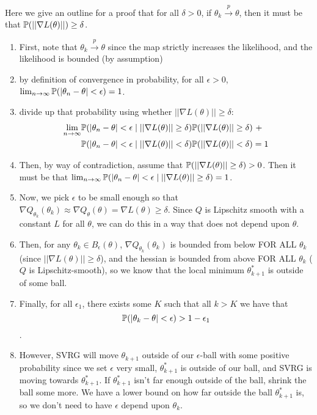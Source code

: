 Here we give an outline for a proof that for all $\delta > 0$, if $\theta_k \overset{p}{\to} \theta$, then it must be that $\mathbb{P}(||\nabla L (\theta) ||) \geq \delta$.

\begin{enumerate}
    \item First, note that $\theta_k \overset{p}{\to} \theta$ since the map strictly increases the likelihood, and the likelihood is bounded (by assumption)
    \item by definition of convergence in probability, for all $\epsilon > 0$, $\lim_{n \to \infty} \mathbb{P}(|\theta_n - \theta| < \epsilon) = 1$.
    \item divide up that probability using whether $||\nabla L (\theta) || \geq \delta$:
    \begin{align*}
    \lim_{n \to \infty} & \mathbb{P}(|\theta_n - \theta| < \epsilon \mid ||\nabla L (\theta) || \geq \delta)\mathbb{P}(||\nabla L (\theta) || \geq \delta) ~ + 
    \\ 
    & \mathbb{P}(|\theta_n - \theta| < \epsilon \mid ||\nabla L (\theta) || < \delta)\mathbb{P}(||\nabla L (\theta) || < \delta) = 1
    \end{align*}
    \item Then, by way of contradiction, assume that $\mathbb{P}(||\nabla L (\theta) || \geq \delta) > 0$. Then it must be that $\lim_{n \to \infty} \mathbb{P}(|\theta_n - \theta| < \epsilon \mid ||\nabla L (\theta) || \geq \delta) = 1$.
    \item Now, we pick $\epsilon$ to be small enough so that $\nabla Q_{\theta_k}(\theta_k) \approx \nabla Q_{\theta}(\theta) = \nabla L(\theta) \geq \delta$. Since $Q$ is Lipschitz smooth with a constant $L$ for all $\theta$, we can do this in a way that does not depend upon $\theta$.
    \item Then, for any $\theta_k \in B_\epsilon(\theta)$, $\nabla Q_{\theta_k}(\theta_k)$ is bounded from below FOR ALL $\theta_k$ (since $||\nabla L(\theta)|| \geq \delta$), and the hessian is bounded from above FOR ALL $\theta_k$ ($Q$ is Lipschitz-smooth), so we know that the local minimum $\theta^*_{k+1}$ is outside of some ball.
    \item Finally, for all $\epsilon_1$, there exists some $K$ such that all $k > K$ we have that 
    $$\mathbb{P}(|\theta_k - \theta| < \epsilon) > 1-\epsilon_1$$.
    \item However, SVRG will move $\theta_{k+1}$ outside of our $\epsilon$-ball with some positive probability since we set $\epsilon$ very small, $\theta^*_{k+1}$ is outside of our ball, and SVRG is moving towards $\theta^*_{k+1}$. If $\theta^*_{k+1}$ isn't far enough outside of the ball, shrink the ball some more. We have a lower bound on how far outside the ball $\theta^*_{k+1}$ is, so we don't need to have $\epsilon$ depend upon $\theta_{k}$.
\end{enumerate}